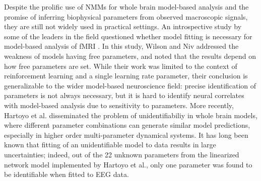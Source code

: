 
Despite the prolific use of NMMs for whole brain model-based analysis and the promise of inferring biophysical parameters from observed macroscopic signals, they are still not widely used in practical settings. An introspective  study by some of the leaders in the field questioned whether model fitting is necessary for model-based analysis of fMRI \cite{wilson_is_2015}. In this study, Wilson and Niv addressed the weakness of models having free parameters, and noted that the results depend on how free parameters are set. While their work was limited to the context of reinforcement learning and a single learning rate parameter, their conclusion is generalizable to the wider model-based neuroscience field: precise identification of parameters is not always necessary, but it is hard to identify neural correlates with model-based analysis due to sensitivity to parameters. More recently, Hartoyo et al. \cite{hartoyo_parameter_2019} disseminated the problem of unidentifiabiliy in whole brain models, where different parameter combinations can generate similar model predictions, especially in higher order multi-parameter dynamical systems. It has long been known that fitting of an unidentifiable model to data results in large uncertainties; indeed, out of the 22 unknown parameters from the linearized network model implemented by Hartoyo et al., only one parameter was found to be identifiable when fitted to EEG data.

